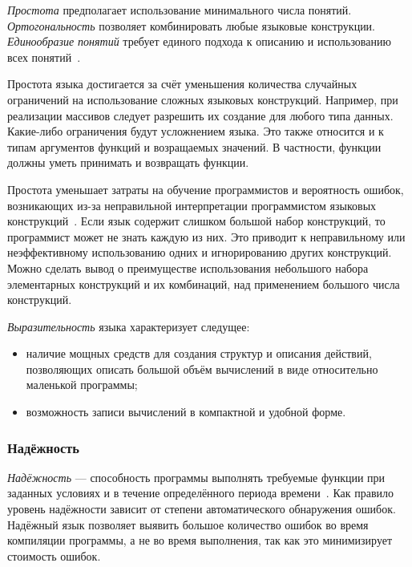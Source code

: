             \textit{Простота} предполагает использование минимального числа понятий.
            \textit{Ортогональность} позволяет комбинировать любые языковые конструкции.
            \textit{Единообразие понятий} требует единого подхода к описанию и использованию всех понятий~\cite{langs}.

            Простота языка достигается за счёт уменьшения количества случайных ограничений на использование сложных языковых конструкций.
            Например, при реализации массивов следует разрешить их создание для любого типа данных.
            Какие-либо ограничения будут усложнением языка.
            Это также относится и к типам аргументов функций и возращаемых значений.
            В частности, функции должны уметь принимать и возвращать функции.

            Простота уменьшает затраты на обучение программистов и вероятность ошибок, возникающих из-за неправильной интерпретации программистом языковых конструкций~\cite{langs}.
            Если язык содержит слишком большой набор конструкций, то программист может не знать каждую из них.
            Это приводит к неправильному или неэффективному использованию одних и игнорированию других конструкций.
            Можно сделать вывод о преимуществе использования небольшого набора элементарных конструкций и их комбинаций, над применением большого числа конструкций.
        
            \textit{Выразительность} языка характеризует следущее:
            \begin{itemize}
                \item наличие мощных средств для создания структур и описания действий, позволяющих описать большой объём вычислений в виде относительно маленькой программы;
                \item возможность записи вычислений в компактной и удобной форме.
            \end{itemize}
        \subsubsection{Надёжность}
            \textit{Надёжность} --- способность программы выполнять требуемые функции при заданных условиях и в течение определённого периода времени~\cite{langs}.
            Как правило уровень надёжности зависит от степени автоматического обнаружения ошибок.
            Надёжный язык позволяет выявить большое количество ошибок во время компиляции программы, а не во время выполнения, так как это минимизирует стоимость ошибок.

